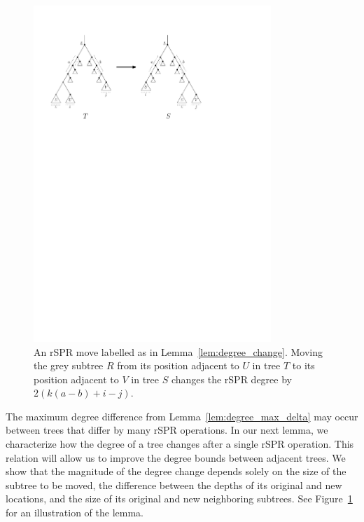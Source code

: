 \documentclass[]{elsarticle}
\let\MYoriglatexcaption\caption
\renewcommand{\caption}[2][\relax]{\MYoriglatexcaption[#2]{#2}}
\begin{document}
\begin{figure}
	\includegraphics[width=0.8\textwidth]{figs/spr-degree-change}
	\caption{An rSPR move labelled as in Lemma~\ref{lem:degree_change}.
Moving the grey subtree $R$ from its position adjacent to $U$ in tree $T$ to its position adjacent to $V$ in tree $S$ changes the rSPR degree by $2\left(k(a-b) + i - j\right)$.}
	\label{fig:spr-degree-change}
\end{figure}

The maximum degree difference from Lemma~\ref{lem:degree_max_delta} may occur between trees that differ by many rSPR operations.
In our next lemma, we characterize how the degree of a tree changes after a single rSPR operation.
This relation will allow us to improve the degree bounds between adjacent trees.
We show that the magnitude of the degree change depends solely on the size of the subtree to be moved, the difference between the depths of its original and new locations, and the size of its original and new neighboring subtrees.
See Figure~\ref{fig:spr-degree-change} for an illustration of the lemma.
\end{document}
